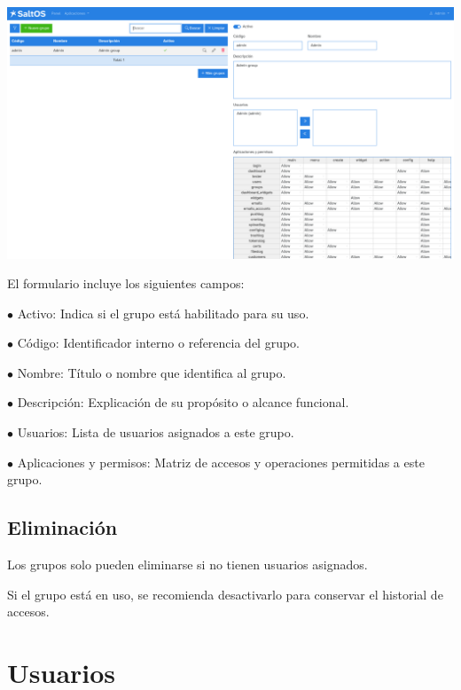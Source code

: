 \documentclass[a4paper]{article}
\begin{document}
\begin{center}\includegraphics[width=1\textwidth]{../ujest/snaps/test-screenshots-js-screenshots-users-groups-edit-1-es-es-1-snap.png}\end{center}

El formulario incluye los siguientes campos:

\begin{compactitem}
\item[\color{myblue}$\bullet$] Activo: Indica si el grupo está habilitado para su uso.
\item[\color{myblue}$\bullet$] Código: Identificador interno o referencia del grupo.
\item[\color{myblue}$\bullet$] Nombre: Título o nombre que identifica al grupo.
\item[\color{myblue}$\bullet$] Descripción: Explicación de su propósito o alcance funcional.
\item[\color{myblue}$\bullet$] Usuarios: Lista de usuarios asignados a este grupo.
\item[\color{myblue}$\bullet$] Aplicaciones y permisos: Matriz de accesos y operaciones permitidas a este grupo.
\end{compactitem}

\hypertarget{toc180}{}
\subsection{Eliminación}

Los grupos solo pueden eliminarse si no tienen usuarios asignados.

Si el grupo está en uso, se recomienda desactivarlo para conservar el historial de accesos.


\hypertarget{toc181}{}
\section{Usuarios}
\end{document}

